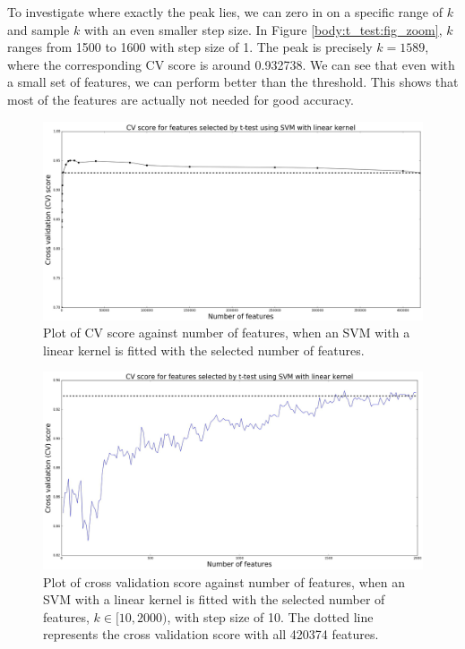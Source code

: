 \documentclass[12pt, twoside, a4paper]{report}
\begin{document}
To investigate where exactly the peak lies, we can zero in on a specific range of $k$ and sample $k$ with an even smaller step size. In Figure \ref{body:t_test:fig_zoom}, $k$ ranges from 1500 to 1600 with step size of 1. The peak is precisely $k=1589$, where the corresponding CV score is around 0.932738. We can see that even with a small set of features, we can perform better than the threshold. This shows that most of the features are actually not needed for good accuracy.


\begin{figure}
\centering
\includegraphics[width=\textwidth]{images/t_test_range.jpeg}
\caption{Plot of CV score against number of features, when an SVM with a linear kernel is fitted with the selected number of features.}
\label{body:t_test:fig:range}
\end{figure}

\begin{figure}
\centering
\includegraphics[width=\textwidth]{images/t_test_2000_uneq_var1.jpeg}
\caption{Plot of cross validation score against number of features, when an SVM with a linear kernel is fitted with the selected number of features, $k \in [10, 2000)$, with step size of 10. The dotted line represents the cross validation score with all 420374 features.}
\label{body:t_test:fig}
\end{figure}
\end{document}
